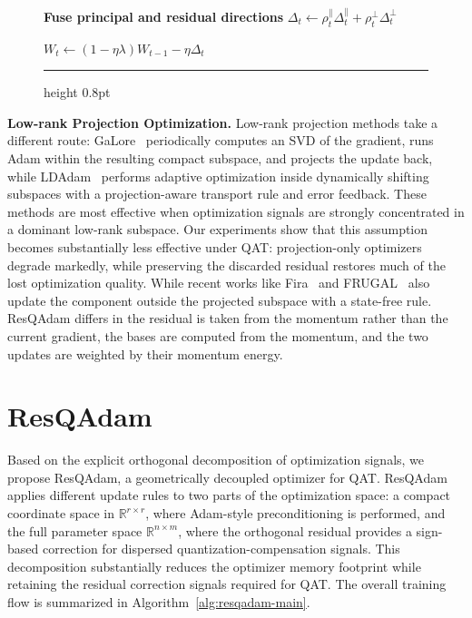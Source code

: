 \documentclass{article} %
\begin{document}
\begin{figure}
\begin{minipage}{0.53\columnwidth}
\begin{algorithmic}
    \State \textbf{Fuse principal and residual directions}
    \Statex \hspace{\algorithmicindent}
    $\Delta_t\leftarrow
    \rho_t^{\parallel}\Delta_t^{\parallel}
    +\rho_t^{\perp}\Delta_t^{\perp}$

    \State $W_t\leftarrow
    (1-\eta\lambda)W_{t-1}-\eta\Delta_t$
\EndFor

\end{algorithmic}
    \end{minipage}

    \vspace{3pt}
    \hrule height 0.8pt
    \vspace{-10pt}
\end{figure}


\textbf{Low-rank Projection Optimization.}
Low-rank projection methods take a different route: GaLore~\citep{zhao2024galore} periodically computes an SVD of the gradient, runs Adam within the resulting compact subspace, and projects the update back, while LDAdam~\citep{robert2025ldadam} performs adaptive optimization inside dynamically shifting subspaces with a projection-aware transport rule and error feedback. 
These methods are most effective when optimization signals are strongly concentrated in a dominant low-rank subspace. 
Our experiments show that this assumption becomes substantially less effective under QAT: projection-only optimizers degrade markedly, while preserving the discarded residual restores much of the lost optimization quality.
While recent works like Fira~\citep{chen2026fira} and FRUGAL~\citep{zmushko2024frugal} also update the component outside the projected subspace with a state-free rule. 
ResQAdam differs in the residual is taken from the momentum rather than the current gradient, the bases are computed from the momentum, and the two updates are weighted by their momentum energy.




\section{ResQAdam}
\label{resq}
Based on the explicit orthogonal decomposition of optimization signals, we propose ResQAdam, a geometrically decoupled optimizer for QAT.
ResQAdam applies different update rules to two parts of the optimization space: a compact coordinate space in $\mathbb{R}^{r \times r}$, where Adam-style preconditioning is performed, and the full parameter space $\mathbb{R}^{n \times m}$, where the orthogonal residual provides a sign-based correction for dispersed quantization-compensation signals.
This decomposition substantially reduces the optimizer memory footprint while retaining the residual correction signals required for QAT.
The overall training flow is summarized in Algorithm~\ref{alg:resqadam-main}.
\end{document}
